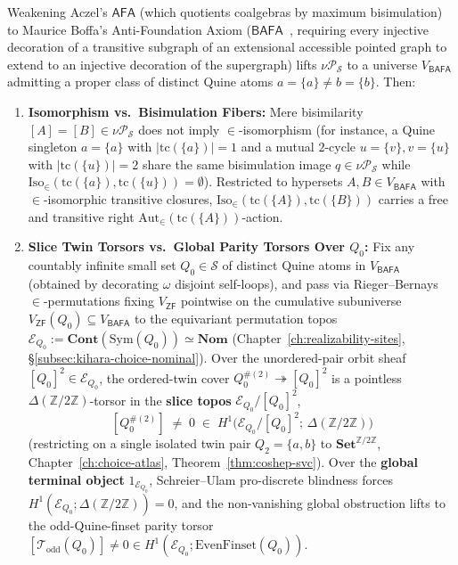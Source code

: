\begin{proposition}\label{prop:boffa-torsors}%
%
%
Weakening Aczel's $\mathsf{AFA}$ (which quotients coalgebras by maximum bisimulation) to Maurice Boffa's Anti-Foundation Axiom ($\mathsf{BAFA}$~\cite{Boffa69}, requiring every injective decoration of a transitive subgraph of an extensional accessible pointed graph to extend to an injective decoration of the supergraph) lifts $\nu \mathcal{P}_{\mathcal{S}}$ to a universe $V_{\mathsf{BAFA}}$ admitting a proper class of distinct Quine atoms $a = \{a\} \neq b = \{b\}$. Then:
\begin{enumerate}
  \item \textbf{Isomorphism vs.\ Bisimulation Fibers:} Mere bisimilarity $[A] = [B] \in \nu \mathcal{P}_{\mathcal{S}}$ does not imply $\in$-isomorphism (for instance, a Quine singleton $a = \{a\}$ with $|\mathrm{tc}(\{a\})| = 1$ and a mutual $2$-cycle $u = \{v\}, v = \{u\}$ with $|\mathrm{tc}(\{u\})| = 2$ share the same bisimulation image $q \in \nu \mathcal{P}_{\mathcal{S}}$ while $\mathrm{Iso}_\in(\mathrm{tc}(\{a\}), \mathrm{tc}(\{u\})) = \emptyset$). Restricted to hypersets $A, B \in V_{\mathsf{BAFA}}$ with $\in$-isomorphic transitive closures, $\mathrm{Iso}_\in(\mathrm{tc}(\{A\}), \mathrm{tc}(\{B\}))$ carries a free and transitive right $\mathrm{Aut}_\in(\mathrm{tc}(\{A\}))$-action.
  \item \textbf{Slice Twin Torsors vs.\ Global Parity Torsors Over $Q_0$:} Fix any countably infinite small set $Q_0 \in \mathcal{S}$ of distinct Quine atoms in $V_{\mathsf{BAFA}}$ (obtained by decorating $\omega$ disjoint self-loops), and pass via Rieger--Bernays~\cite{Bernays54,Rieger57} $\in$-permutations fixing $V_{\mathsf{ZF}}$ pointwise on the cumulative subuniverse $V_{\mathsf{ZF}}(Q_0) \subseteq V_{\mathsf{BAFA}}$ to the equivariant permutation topos $\mathcal{E}_{Q_0} := \mathbf{Cont}(\mathrm{Sym}(Q_0)) \simeq \mathbf{Nom}$ (Chapter~\ref{ch:realizability-sites}, \S\ref{subsec:kihara-choice-nominal}). Over the unordered-pair orbit sheaf $[Q_0]^2 \in \mathcal{E}_{Q_0}$, the ordered-twin cover $Q_0^{\#(2)} \twoheadrightarrow [Q_0]^2$ is a pointless $\Delta(\mathbb{Z}/2\mathbb{Z})$-torsor in the \textbf{slice topos} $\mathcal{E}_{Q_0}/[Q_0]^2$,
  \[
    [Q_0^{\#(2)}] \;\neq\; 0 \;\in\; H^1\bigl(\mathcal{E}_{Q_0}/[Q_0]^2;\, \Delta(\mathbb{Z}/2\mathbb{Z})\bigr)
  \]
  (restricting on a single isolated twin pair $Q_2 = \{a, b\}$ to $\mathbf{Set}^{\mathbb{Z}/2\mathbb{Z}}$, Chapter~\ref{ch:choice-atlas}, Theorem~\ref{thm:coshep-svc}). Over the \textbf{global terminal object} $1_{\mathcal{E}_{Q_0}}$, Schreier--Ulam pro-discrete blindness forces $H^1(\mathcal{E}_{Q_0}; \Delta(\mathbb{Z}/2\mathbb{Z})) = 0$, and the non-vanishing global obstruction lifts to the odd-Quine-finset parity torsor $[\mathcal{T}_{\mathrm{odd}}(Q_0)] \neq 0 \in H^1(\mathcal{E}_{Q_0}; \mathrm{EvenFinset}(Q_0))$.
\end{enumerate}
\end{proposition}

